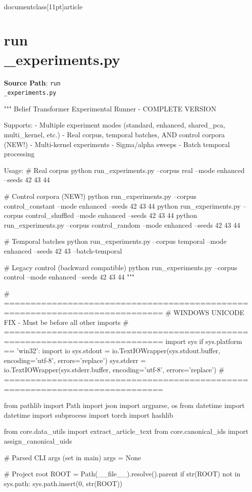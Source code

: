 \\documentclass[11pt]{article}
\begin{document}
\section*{run\\_experiments.py}
\textbf{Source Path}: \texttt{run\\_experiments.py}\par
\bigskip
\begin{CodeBlock}
"""
Belief Transformer Experimental Runner - COMPLETE VERSION

Supports:
- Multiple experiment modes (standard, enhanced, shared_pca, multi_kernel, etc.)
- Real corpus, temporal batches, AND control corpora (NEW!)
- Multi-kernel experiments  
- Sigma/alpha sweeps
- Batch temporal processing

Usage:
    # Real corpus
    python run_experiments.py --corpus real --mode enhanced --seeds 42 43 44
    
    # Control corpora (NEW!)
    python run_experiments.py --corpus control_constant --mode enhanced --seeds 42 43 44
    python run_experiments.py --corpus control_shuffled --mode enhanced --seeds 42 43 44
    python run_experiments.py --corpus control_random --mode enhanced --seeds 42 43 44
    
    # Temporal batches
    python run_experiments.py --corpus temporal --mode enhanced --seeds 42 43 --batch-temporal
    
    # Legacy control (backward compatible)
    python run_experiments.py --corpus control --mode enhanced --seeds 42 43 44
"""

# ============================================================================
# WINDOWS UNICODE FIX - Must be before all other imports
# ============================================================================
import sys
if sys.platform == 'win32':
    import io
    sys.stdout = io.TextIOWrapper(sys.stdout.buffer, encoding='utf-8', errors='replace')
    sys.stderr = io.TextIOWrapper(sys.stderr.buffer, encoding='utf-8', errors='replace')
# ============================================================================

from pathlib import Path
import json
import argparse, os
from datetime import datetime
import subprocess
import torch
import hashlib

from core.data_utils import extract_article_text
from core.canonical_ids import assign_canonical_uids

# Parsed CLI args (set in main)
args = None

# Project root
ROOT = Path(__file__).resolve().parent
if str(ROOT) not in sys.path:
    sys.path.insert(0, str(ROOT))


\end{CodeBlock}
\end{document}
